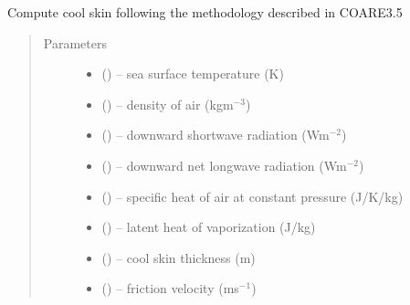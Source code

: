 \documentclass[letterpaper,10pt,english]{sphinxmanual}
\begin{document}
\begin{fulllineitems}
\label{\detokenize{index:cs_wl_subs.cs_C35}}
Compute cool skin following the methodology described in COARE3.5 \citep{Fairall_etal_1996b, Edson_etal_2013}
\begin{quote}\begin{description}
\item[{Parameters}] \leavevmode\begin{itemize}
\item {} 
 (\href{https://docs.python.org/3/library/functions.html\#float}{}) -- sea surface temperature (K)

\item {} 
 (\href{https://docs.python.org/3/library/functions.html\#float}{}) -- density of air (kgm$^{-3}$)

\item {} 
 (\href{https://docs.python.org/3/library/functions.html\#float}{}) -- downward shortwave radiation (Wm$^{-2}$)

\item {} 
 (\href{https://docs.python.org/3/library/functions.html\#float}{}) -- downward net longwave radiation (Wm$^{-2}$)

\item {} 
 (\href{https://docs.python.org/3/library/functions.html\#float}{}) -- specific heat of air at constant pressure (J/K/kg)

\item {} 
 (\href{https://docs.python.org/3/library/functions.html\#float}{}) -- latent heat of vaporization (J/kg)

\item {} 
 (\href{https://docs.python.org/3/library/functions.html\#float}{}) -- cool skin thickness (m)

\item {} 
 (\href{https://docs.python.org/3/library/functions.html\#float}{}) -- friction velocity (ms$^{-1}$)


\end{itemize}
\end{description}
\end{quote}
\end{fulllineitems}
\end{document}
